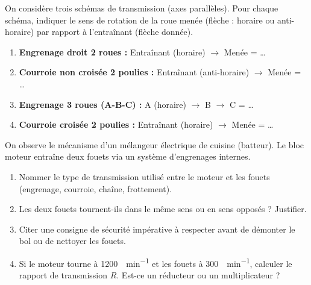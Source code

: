 \documentclass[11pt]{article}
\begin{document}
\begin{exercice}
On considère trois schémas de transmission (axes parallèles). Pour chaque schéma, indiquer le sens de rotation de la roue menée (flèche : horaire ou anti-horaire) par rapport à l'entraînant (flèche donnée).
\begin{enumerate}
    \item \textbf{Engrenage droit 2 roues :} Entraînant (horaire) $\rightarrow$ Menée = \ldots
    \item \textbf{Courroie non croisée 2 poulies :} Entraînant (anti-horaire) $\rightarrow$ Menée = \ldots
    \item \textbf{Engrenage 3 roues (A-B-C) :} A (horaire) $\rightarrow$ B $\rightarrow$ C = \ldots
    \item \textbf{Courroie croisée 2 poulies :} Entraînant (horaire) $\rightarrow$ Menée = \ldots
\end{enumerate}
\end{exercice}

\begin{exercice}
On observe le mécanisme d'un mélangeur électrique de cuisine (batteur). Le bloc moteur entraîne deux fouets via un système d'engrenages internes.
\begin{enumerate}
    \item Nommer le type de transmission utilisé entre le moteur et les fouets (engrenage, courroie, chaîne, frottement).
    \item Les deux fouets tournent-ils dans le même sens ou en sens opposés ? Justifier.
    \item Citer une consigne de sécurité impérative à respecter avant de démonter le bol ou de nettoyer les fouets.
    \item Si le moteur tourne à \SI{1200}{\tr\per\minute} et les fouets à \SI{300}{\tr\per\minute}, calculer le rapport de transmission $R$. Est-ce un réducteur ou un multiplicateur ?
\end{enumerate}
\end{exercice}
\end{document}
